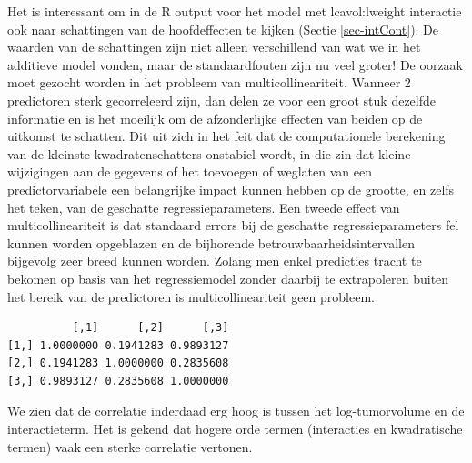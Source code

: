 \documentclass[
  dutch,
  letterpaper,
  12pt]{book}
\newenvironment{Shaded}{\begin{snugshade}}{\end{snugshade}}
\newcommand{\FunctionTok}[1]{\textcolor[rgb]{0.28,0.35,0.67}{#1}}
\newcommand{\NormalTok}[1]{\textcolor[rgb]{0.00,0.23,0.31}{#1}}
\newcommand{\SpecialCharTok}[1]{\textcolor[rgb]{0.37,0.37,0.37}{#1}}
\theoremstyle{definition}
\theoremstyle{definition}
\theoremstyle{definition}
\theoremstyle{remark}
\begin{document}
Het is interessant om in de R output voor het model met lcavol:lweight
interactie ook naar schattingen van de hoofdeffecten te kijken (Sectie
\ref{sec-intCont}). De waarden van de schattingen zijn niet alleen
verschillend van wat we in het additieve model vonden, maar de
standaardfouten zijn nu veel groter! De oorzaak moet gezocht worden in
het probleem van multicollineariteit. Wanneer 2 predictoren sterk
gecorreleerd zijn, dan delen ze voor een groot stuk dezelfde informatie
en is het moeilijk om de afzonderlijke effecten van beiden op de
uitkomst te schatten. Dit uit zich in het feit dat de computationele
berekening van de kleinste kwadratenschatters onstabiel wordt, in die
zin dat kleine wijzigingen aan de gegevens of het toevoegen of weglaten
van een predictorvariabele een belangrijke impact kunnen hebben op de
grootte, en zelfs het teken, van de geschatte regressieparameters. Een
tweede effect van multicollineariteit is dat standaard errors bij de
geschatte regressieparameters fel kunnen worden opgeblazen en de
bijhorende betrouwbaarheidsintervallen bijgevolg zeer breed kunnen
worden. Zolang men enkel predicties tracht te bekomen op basis van het
regressiemodel zonder daarbij te extrapoleren buiten het bereik van de
predictoren is multicollineariteit geen probleem.

\begin{Shaded}
\end{Shaded}

\begin{verbatim}
          [,1]      [,2]      [,3]
[1,] 1.0000000 0.1941283 0.9893127
[2,] 0.1941283 1.0000000 0.2835608
[3,] 0.9893127 0.2835608 1.0000000
\end{verbatim}

We zien dat de correlatie inderdaad erg hoog is tussen het
log-tumorvolume en de interactieterm. Het is gekend dat hogere orde
termen (interacties en kwadratische termen) vaak een sterke correlatie
vertonen.
\end{document}
